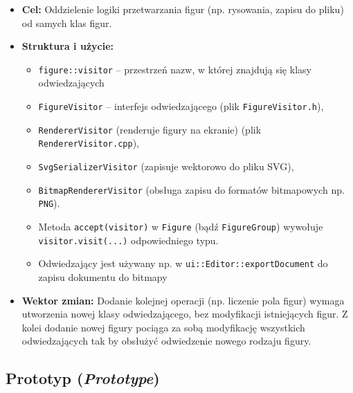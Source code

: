 \documentclass[a4paper,12pt]{article}
\begin{document}
\begin{itemize}
    \item \textbf{Cel:} Oddzielenie logiki przetwarzania figur (np. rysowania, 
    zapisu do pliku) od samych klas figur.
    \item \textbf{Struktura i użycie:}
    \begin{itemize}
      \item \texttt{figure::visitor} -- przestrzeń nazw, w której znajdują się klasy odwiedzających
      \item \texttt{FigureVisitor} -- interfejs odwiedzającego (plik \verb|FigureVisitor.h|), 
      \item \texttt{RendererVisitor} (renderuje figury na ekranie) (plik \verb|RendererVisitor.cpp|),
      \item \texttt{SvgSerializerVisitor} (zapisuje wektorowo do pliku SVG),
      \item \texttt{BitmapRendererVisitor} (obsługa zapisu do formatów bitmapowych np. \texttt{PNG}).
      \item Metoda \texttt{accept(visitor)} w \texttt{Figure} (bądź \texttt{FigureGroup})
      wywołuje \texttt{visitor.visit(...)} odpowiedniego typu.
      \item Odwiedzający jest używany np. w \verb|ui::Editor::exportDocument| 
        do zapisu dokumentu do bitmapy
    \end{itemize}
    \item \textbf{Wektor zmian:} Dodanie kolejnej operacji (np. liczenie pola figur)
    wymaga utworzenia nowej klasy odwiedzającego, bez modyfikacji istniejących figur. Z kolei
    dodanie nowej figury pociąga za sobą modyfikację wszystkich odwiedzających tak
    by obsłużyć odwiedzenie nowego rodzaju figury.
\end{itemize}

\subsection{Prototyp (\emph{Prototype})}
\end{document}
